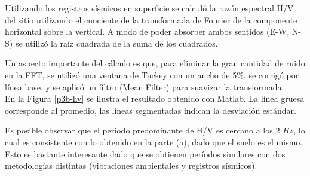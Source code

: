 Utilizando los registros sísmicos en superficie se calculó la razón espectral H/V del sitio utilizando el cuociente de la transformada de Fourier de la componente horizontal sobre la vertical. A modo de poder absorber ambos sentidos (E-W, N-S) se utilizó la raíz cuadrada de la suma de los cuadrados.


Un aspecto importante del cálculo es que, para eliminar la gran cantidad de ruido en la FFT, se utilizó una ventana de Tuckey con un ancho de 5\%, se corrigó por línea base, y se aplicó un filtro (Mean Filter) para suavizar la transformada. \\

En la Figura \ref{p3b-hv} se ilustra el resultado obtenido con Matlab. La línea gruesa corresponde al promedio, las líneas segmentadas indican la desviación estándar.


Es posible observar que el período predominante de H/V es cercano a los 2 $Hz$, lo cual es consistente con lo obtenido en la parte (a), dado que el suelo es el mismo. Esto es bastante interesante dado que se obtienen períodos similares con dos metodologías distintas (vibraciones ambientales y registros sísmicos). 